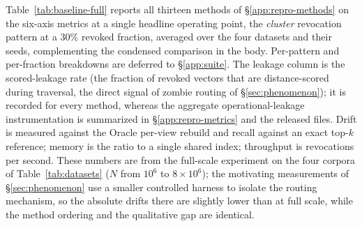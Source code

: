 \documentclass[sigconf, nonacm, review]{acmart}
\begin{document}
Table~\ref{tab:baseline-full} reports all thirteen methods of
\S\ref{app:repro-methods} on the six-axis metrics at a single headline operating
point, the \emph{cluster} revocation pattern at a $30\%$ revoked fraction,
averaged over the four datasets and their seeds, complementing the condensed
comparison in the body. Per-pattern and per-fraction breakdowns are deferred to
\S\ref{app:suite}. The leakage column is the scored-leakage rate (the fraction
of revoked vectors that are distance-scored during traversal, the direct signal
of zombie routing of \S\ref{sec:phenomenon}); it is recorded for every method,
whereas the aggregate operational-leakage instrumentation is summarized in
\S\ref{app:repro-metrics} and the released files. Drift is measured against the
Oracle per-view rebuild and recall against an exact top-$k$ reference; memory is
the ratio to a single shared index; throughput is revocations per second. These
numbers are from the full-scale experiment on the four corpora of
Table~\ref{tab:datasets} ($N$ from $10^{6}$ to $8\!\times\!10^{6}$); the
motivating measurements of \S\ref{sec:phenomenon} use a smaller controlled
harness to isolate the routing mechanism, so the absolute drifts there are
slightly lower than at full scale, while the method ordering and the
qualitative gap are identical.
\end{document}
